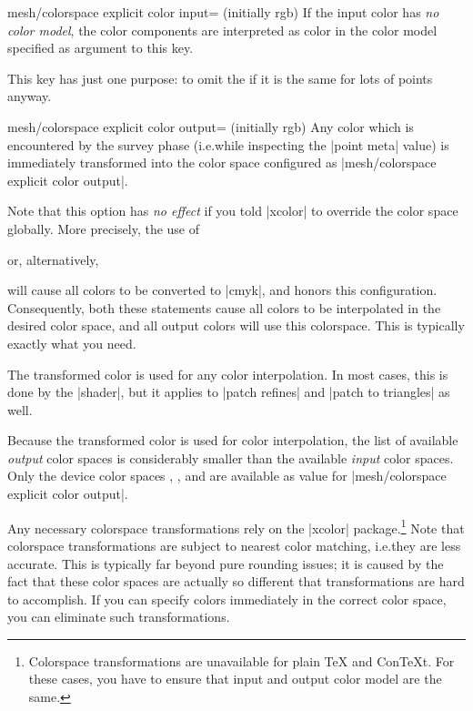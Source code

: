 {{\begin{pgfplotskey}{mesh/colorspace explicit color input= (initially rgb)%
}
    If the input color has \emph{no color model}, the color components are
    interpreted as color in the color model specified as argument to this key.

    This key has just one purpose: to omit the  if it is the
    same for lots of points anyway.
\end{pgfplotskey}

\begin{pgfplotskey}{%
    mesh/colorspace explicit color output= (initially rgb)%
}
    Any color which is encountered by the survey phase (i.e.\@ while inspecting
    the |point meta| value) is immediately transformed into the color space
    configured as |mesh/colorspace explicit color output|.

    Note that this option has \emph{no effect} if you told |xcolor| to override
    the color space globally. More precisely, the use of
\begin{codeexample}
\usepackage[cmyk]{xcolor}
\end{codeexample}
    or, alternatively,
\begin{codeexample}
\end{codeexample}
    will cause all colors to be converted to |cmyk|, and \PGFPlots{} honors
    this configuration. Consequently, both these statements cause all colors to
    be interpolated in the desired color space, and all output colors will use
    this colorspace. This is typically exactly what you need.

    The transformed color is used for any color interpolation. In most cases,
    this is done by the |shader|, but it applies to |patch refines| and
    |patch to triangles| as well.

    Because the transformed color is used for color interpolation, the list of
    available \emph{output} color spaces is considerably smaller than the
    available \emph{input} color spaces. Only the device color spaces
    , , and  are available
    as value for |mesh/colorspace explicit color output|.

    Any necessary colorspace transformations rely on the |xcolor|
    package.\footnote{Colorspace transformations are unavailable for plain
    \TeX{} and Con\TeX{}t. For these cases, you have to ensure that input and
    output color model are the same.} Note that colorspace transformations are
    subject to nearest color matching, i.e.\@ they are less accurate. This is
    typically far beyond pure rounding issues; it is caused by the fact that
    these color spaces are actually so different that transformations are hard
    to accomplish. If you can specify colors immediately in the correct color
    space, you can eliminate such transformations.


\end{pgfplotskey}}}
